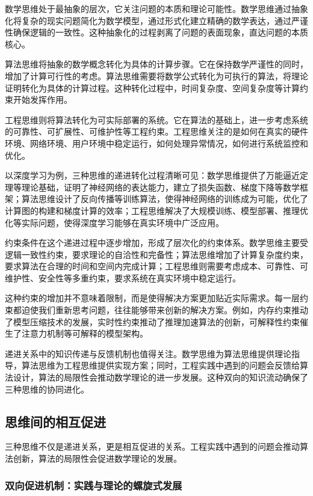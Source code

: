数学思维处于最抽象的层次，它关注问题的本质和理论可能性。数学思维通过抽象化将复杂的现实问题简化为数学模型，通过形式化建立精确的数学表达，通过严谨性确保逻辑的一致性。这种抽象化的过程剥离了问题的表面现象，直达问题的本质核心。

算法思维将抽象的数学概念转化为具体的计算步骤。它在保持数学严谨性的同时，增加了计算可行性的考虑。算法思维需要将数学公式转化为可执行的算法，将理论证明转化为具体的计算过程。这种转化过程中，时间复杂度、空间复杂度等计算约束开始发挥作用。

工程思维则将算法转化为可实际部署的系统。它在算法的基础上，进一步考虑系统的可靠性、可扩展性、可维护性等工程约束。工程思维关注的是如何在真实的硬件环境、网络环境、用户环境中稳定运行，如何处理异常情况，如何进行系统监控和优化。

以深度学习为例，三种思维的递进转化过程清晰可见：数学思维提供了万能逼近定理等理论基础，证明了神经网络的表达能力，建立了损失函数、梯度下降等数学框架；算法思维设计了反向传播等训练算法，使得神经网络的训练成为可能，优化了计算图的构建和梯度计算的效率；工程思维解决了大规模训练、模型部署、推理优化等实际问题，使得深度学习能够在真实环境中广泛应用。

约束条件在这个递进过程中逐步增加，形成了层次化的约束体系。数学思维主要受逻辑一致性约束，要求理论的自洽性和完备性；算法思维增加了计算复杂度约束，要求算法在合理的时间和空间内完成计算；工程思维则需要考虑成本、可靠性、可维护性、安全性等多重约束，要求系统在真实环境中稳定运行。

这种约束的增加并不意味着限制，而是使得解决方案更加贴近实际需求。每一层约束都迫使我们重新思考问题，往往能够带来创新的解决方案。例如，内存约束推动了模型压缩技术的发展，实时性约束推动了推理加速算法的创新，可解释性约束催生了注意力机制等可解释的模型架构。

递进关系中的知识传递与反馈机制也值得关注。数学思维为算法思维提供理论指导，算法思维为工程思维提供实现方案；同时，工程实践中遇到的问题会反馈给算法设计，算法的局限性会推动数学理论的进一步发展。这种双向的知识流动确保了三种思维的协同进化。

\subsection{思维间的相互促进}

三种思维不仅是递进关系，更是相互促进的关系。工程实践中遇到的问题会推动算法创新，算法的局限性会促进数学理论的发展。

\subsubsection{双向促进机制：实践与理论的螺旋式发展}

